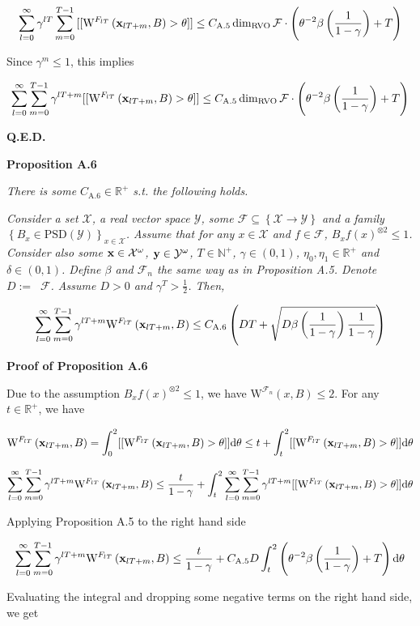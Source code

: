 \documentclass[a4paper]{article}
\newcommand{\Co}[1]{}
\newcommand{\AP}[1]{\left(#1\right)}
\newcommand{\AC}[1]{\left\{#1\right\}}
\newcommand{\D}{\mathrm{d}}
\newcommand{\Nats}{\mathbb{N}}
\newcommand{\Reals}{\mathbb{R}}
\newcommand{\PSD}{\mathrm{PSD}}
\newcommand{\B}{B}
\newcommand{\X}{\mathcal{X}}
\newcommand{\Y}{\mathcal{Y}}
\newcommand{\F}{\mathcal{F}}
\DeclareMathOperator{\RVO}{\dim_{RVO}}
\newcommand{\W}{\mathrm{W}}
\begin{document}
$$\sum_{l=0}^{\infty}\gamma^{lT}\sum_{m=0}^{T-1}{[[\W^{F_{lT}}\AP{\bold{x}_{lT+m},\B}>\theta]]} \leq C_{\text{A.5}}\RVO{\F}\cdot\AP{\theta^{-2}\beta\AP{\frac{1}{1-\gamma}}+T}$$

Since $\gamma^m\leq1$, this implies

$$\sum_{l=0}^\infty\sum_{m=0}^{T-1}{\gamma^{lT+m}[[\W^{F_{lT}}\AP{\bold{x}_{lT+m},B}>\theta]]} \leq C_{\mathrm{A.5}}\RVO{\F}\cdot\AP{\theta^{-2}\beta\AP{\frac{1}{1-\gamma}}+T}$$

\textbf{Q.E.D.}\Co{b}

\textbf{Proposition A.6}\Co{b}

\textit{There is some $C_{\mathrm{A.6}}\in\Reals^+$ s.t. the following holds.}\Co{i}

\textit{Consider a set $\X$, a real vector space $\Y$, some $\F\subseteq\AC{\X\rightarrow\Y}$ and a family $\AC{\B _x\in\PSD(\Y)}_{x\in\X}$. Assume that for any $x\in\X$ and $f\in\F$, $\B _x{f(x)}^{\otimes2}\leq 1$. Consider also some $\bold{x}\in\X^\omega$, $\bold{y}\in\Y^\omega$, $T\in\Nats^+$, $\gamma\in(0,1)$, $\eta_0,\eta_1\in\Reals^+$ and $\delta\in(0,1)$. Define $\beta$ and $\F_n$ the same way as in Proposition A.5. Denote $D:=\RVO{\F}$. Assume $D>0$ and $\gamma^T>\frac{1}{2}$. Then,}\Co{i}

$$\sum_{l=0}^\infty\sum_{m=0}^{T-1}{\gamma^{lT+m}\W^{F_{lT}}\AP{\bold{x}_{lT+m},B}} \leq C_{\mathrm{A.6}}\AP{D T+\sqrt{D\beta\AP{\frac{1}{1-\gamma}}\frac{1}{1-\gamma}}}$$

\textbf{Proof of Proposition A.6}\Co{b}

Due to the assumption $B_xf(x)^{\otimes2}\leq1$, we have $\W^{\F_n}(x,\B)\leq 2$. For any $t\in\Reals^+$, we have

$$\W^{F_{lT}}\AP{\bold{x}_{lT+m},B}=\int_0^2[[\W^{F_{lT}}\AP{\bold{x}_{lT+m},B}>\theta]]\D\theta\leq t+\int_t^2[[\W^{F_{lT}}\AP{\bold{x}_{lT+m},B}>\theta]]\D\theta$$

$$\sum_{l=0}^\infty\sum_{m=0}^{T-1}{\gamma^{lT+m}\W^{F_{lT}}\AP{\bold{x}_{lT+m},B}}\leq\frac{t}{1-\gamma}+\int_t^2 \sum_{l=0}^\infty\sum_{m=0}^{T-1}{\gamma^{lT+m}[[\W^{F_{lT}}\AP{\bold{x}_{lT+m},\B}>\theta]]}\D\theta$$

Applying Proposition A.5 to the right hand side

$$\sum_{l=0}^\infty\sum_{m=0}^{T-1}{\gamma^{lT+m}\W^{F_{lT}}\AP{\bold{x}_{lT+m},B}}\leq\frac{t}{1-\gamma}+C_{\text{A.5}}D\int_t^2 \AP{\theta^{-2}\beta\AP{\frac{1}{1-\gamma}}+T}\D\theta$$

Evaluating the integral and dropping some negative terms on the right hand side, we get
\end{document}
